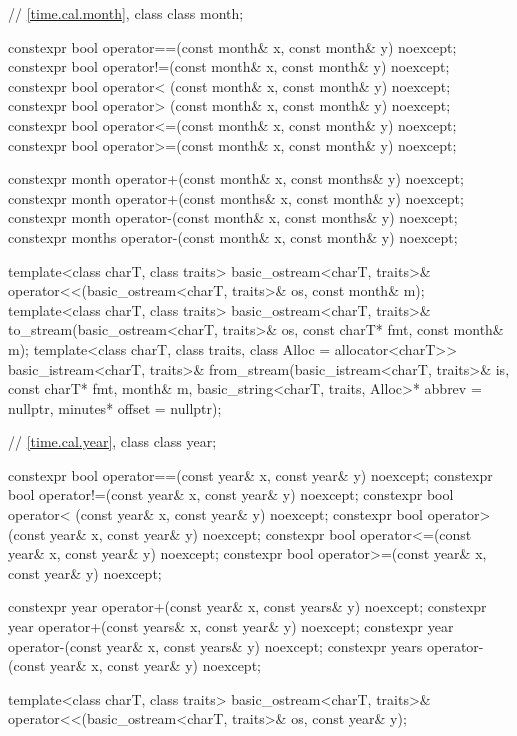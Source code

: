 \begin{codeblock}
{{    // \ref{time.cal.month}, class 
    class month;

    constexpr bool operator==(const month& x, const month& y) noexcept;
    constexpr bool operator!=(const month& x, const month& y) noexcept;
    constexpr bool operator< (const month& x, const month& y) noexcept;
    constexpr bool operator> (const month& x, const month& y) noexcept;
    constexpr bool operator<=(const month& x, const month& y) noexcept;
    constexpr bool operator>=(const month& x, const month& y) noexcept;

    constexpr month  operator+(const month&  x, const months& y) noexcept;
    constexpr month  operator+(const months& x,  const month& y) noexcept;
    constexpr month  operator-(const month&  x, const months& y) noexcept;
    constexpr months operator-(const month&  x,  const month& y) noexcept;

    template<class charT, class traits>
      basic_ostream<charT, traits>&
        operator<<(basic_ostream<charT, traits>& os, const month& m);
    template<class charT, class traits>
      basic_ostream<charT, traits>&
        to_stream(basic_ostream<charT, traits>& os, const charT* fmt, const month& m);
    template<class charT, class traits, class Alloc = allocator<charT>>
      basic_istream<charT, traits>&
        from_stream(basic_istream<charT, traits>& is, const charT* fmt,
                    month& m, basic_string<charT, traits, Alloc>* abbrev = nullptr,
                    minutes* offset = nullptr);

    // \ref{time.cal.year}, class 
    class year;

    constexpr bool operator==(const year& x, const year& y) noexcept;
    constexpr bool operator!=(const year& x, const year& y) noexcept;
    constexpr bool operator< (const year& x, const year& y) noexcept;
    constexpr bool operator> (const year& x, const year& y) noexcept;
    constexpr bool operator<=(const year& x, const year& y) noexcept;
    constexpr bool operator>=(const year& x, const year& y) noexcept;

    constexpr year  operator+(const year&  x, const years& y) noexcept;
    constexpr year  operator+(const years& x, const year&  y) noexcept;
    constexpr year  operator-(const year&  x, const years& y) noexcept;
    constexpr years operator-(const year&  x, const year&  y) noexcept;

    template<class charT, class traits>
      basic_ostream<charT, traits>&
        operator<<(basic_ostream<charT, traits>& os, const year& y);

}}
\end{codeblock}
